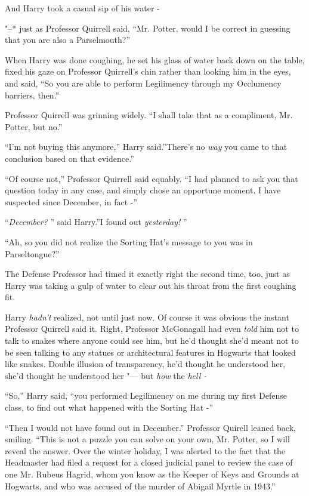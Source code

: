 And Harry took a casual sip of his water -

"--* just as Professor Quirrell said, ``Mr. Potter, would I be correct in
guessing that you are also a Parselmouth?''

When Harry was done coughing, he set his glass of water back down on the
table, fixed his gaze on Professor Quirrell's chin rather than looking
him in the eyes, and said, ``So you are able to perform Legilimency
through my Occlumency barriers, then.''

Professor Quirrell was grinning widely. ``I shall take that as a
compliment, Mr. Potter, but no.''

``I'm not buying this anymore,'' Harry said.''There's no \emph{way} you
came to that conclusion based on that evidence.''

``Of course not,'' Professor Quirrell said equably. ``I had planned to
ask you that question today in any case, and simply chose an opportune
moment. I have suspected since December, in fact -''

``\emph{December?} '' said Harry.''I found out \emph{yesterday!} ''

``Ah, so you did not realize the Sorting Hat's message to you was in
Parseltongue?''

The Defense Professor had timed it exactly right the second time, too,
just as Harry was taking a gulp of water to clear out his throat from
the first coughing fit.

Harry \emph{hadn't} realized, not until just now. Of course it was
obvious the instant Professor Quirrell said it. Right, Professor
McGonagall had even \emph{told} him not to talk to snakes where anyone
could see him, but he'd thought she'd meant not to be seen talking to
any statues or architectural features in Hogwarts that looked like
snakes. Double illusion of transparency, he'd thought he understood her,
she'd thought he understood her "--- but \emph{how} the \emph{hell -}

``So,'' Harry said, ``you performed Legilimency on me during my first
Defense class, to find out what happened with the Sorting Hat -''

``Then I would not have found out in December.'' Professor Quirell
leaned back, smiling. ``This is not a puzzle you can solve on your own,
Mr. Potter, so I will reveal the answer. Over the winter holiday, I was
alerted to the fact that the Headmaster had filed a request for a closed
judicial panel to review the case of one Mr. Rubeus Hagrid, whom you
know as the Keeper of Keys and Grounds at Hogwarts, and who was accused
of the murder of Abigail Myrtle in 1943.''

